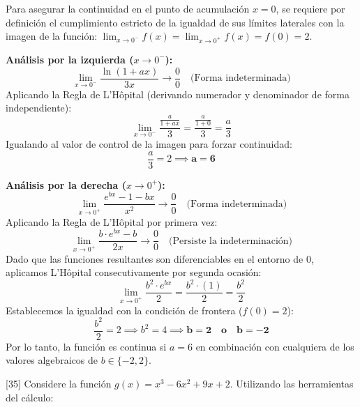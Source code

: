 \documentclass[11pt,paper=a4,answers, addpoints]{exam}
\begin{document}
\begin{questions}
\begin{solution}
Para asegurar la continuidad en el punto de acumulación $x=0$, se requiere por definición el cumplimiento estricto de la igualdad de sus límites laterales con la imagen de la función: $\lim_{x \to 0^-} f(x) = \lim_{x \to 0^+} f(x) = f(0) = 2$.

\textbf{Análisis por la izquierda ($x \to 0^-$):}
\[
\lim_{x \to 0^-} \frac{\ln(1+ax)}{3x} \to \frac{0}{0} \quad \text{(Forma indeterminada)}
\]
Aplicando la Regla de L'Hôpital (derivando numerador y denominador de forma independiente):
\[
\lim_{x \to 0^-} \frac{\frac{a}{1+ax}}{3} = \frac{\frac{a}{1+0}}{3} = \frac{a}{3}
\]
Igualando al valor de control de la imagen para forzar continuidad:
\[
\frac{a}{3} = 2 \implies \mathbf{a = 6}
\]

\textbf{Análisis por la derecha ($x \to 0^+$):}
\[
\lim_{x \to 0^+} \frac{e^{bx} - 1 - bx}{x^2} \to \frac{0}{0} \quad \text{(Forma indeterminada)}
\]
Aplicando la Regla de L'Hôpital por primera vez:
\[
\lim_{x \to 0^+} \frac{b\cdot e^{bx} - b}{2x} \to \frac{0}{0} \quad \text{(Persiste la indeterminación)}
\]
Dado que las funciones resultantes son diferenciables en el entorno de $0$, aplicamos L'Hôpital consecutivamente por segunda ocasión:
\[
\lim_{x \to 0^+} \frac{b^2 \cdot e^{bx}}{2} = \frac{b^2 \cdot (1)}{2} = \frac{b^2}{2}
\]
Establecemos la igualdad con la condición de frontera ($f(0)=2$):
\[
\frac{b^2}{2} = 2 \implies b^2 = 4 \implies \mathbf{b = 2 \quad \text{o} \quad b = -2}
\]
Por lo tanto, la función es continua si $a = 6$ en combinación con cualquiera de los valores algebraicos de $b \in \{-2, 2\}$.
\end{solution}

[35]
Considere la función $g(x) = x^3 - 6x^2 + 9x + 2$. Utilizando las herramientas del cálculo:


\end{questions}
\end{document}
